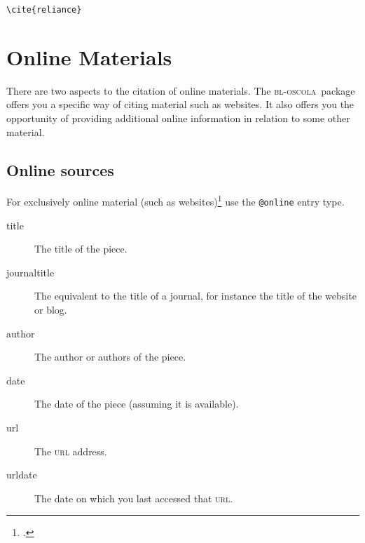 \documentclass[a5paper,fontsize=9pt,DIV=1]{scrartcl}
\newcommand{\oscola}{\textsc{bl-oscola}}
\newcommand{\egcite}[1]{\texttt{\textbackslash cite#1}}
\begin{document}
\begin{description}
\item[\egcite{\{reliance\}}] \cite{reliance}
\end{description}


\section{Online Materials\label{urls}}
There are two aspects to the citation of online materials. The
\oscola\ package offers you a specific way of citing material such as
websites. It also offers you the opportunity of providing additional
online information in relation to some other material.

\subsection{Online sources}

For exclusively online material (such as
websites)\footcite[42]{oscola} use the \texttt{@online} entry type.

\begin{description}
\item[title] The title of the piece.
\item[journaltitle] The equivalent to the title of a journal, for instance the title of the website or blog.
\item[author] The author or authors of the piece.
\item[date] The date of the piece (assuming it is available).
\item[url] The \textsc{url} address.
\item[urldate] The date on which you last accessed that \textsc{url}.
\end{description} 
\end{document}
